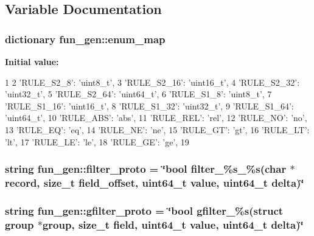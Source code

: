 \subsection{\-Variable \-Documentation}
\hypertarget{namespacefun__gen_a3f0fc2c7eb9b8116260fdfe608911309}{
\subsubsection[{enum\-\_\-map}]{\setlength{\rightskip}{0pt plus 5cm}dictionary {\bf fun\-\_\-gen\-::enum\-\_\-map}}}\label{namespacefun__gen_a3f0fc2c7eb9b8116260fdfe608911309}
{\bfseries \-Initial value\-:}
\begin{DoxyCode}
1 {
2     'RULE_S2_8': 'uint8_t',
3     'RULE_S2_16': 'uint16_t',
4     'RULE_S2_32': 'uint32_t',
5     'RULE_S2_64': 'uint64_t',
6     'RULE_S1_8': 'uint8_t',
7     'RULE_S1_16': 'uint16_t',
8     'RULE_S1_32': 'uint32_t',
9     'RULE_S1_64': 'uint64_t',
10     'RULE_ABS': 'abs',
11     'RULE_REL': 'rel',
12     'RULE_NO': 'no',
13     'RULE_EQ': 'eq',
14     'RULE_NE': 'ne',
15     'RULE_GT': 'gt',
16     'RULE_LT': 'lt',
17     'RULE_LE': 'le',
18     'RULE_GE': 'ge',
19 }
\end{DoxyCode}
\hypertarget{namespacefun__gen_aeb238801eab5d97517c3bfecab2e88b8}{
\subsubsection[{filter\-\_\-proto}]{\setlength{\rightskip}{0pt plus 5cm}string {\bf fun\-\_\-gen\-::filter\-\_\-proto} = \char`\"{}bool filter\-\_\-\%s\-\_\-\%s(char $\ast$record, size\-\_\-t field\-\_\-offset, uint64\-\_\-t value, uint64\-\_\-t delta)\char`\"{}}}\label{namespacefun__gen_aeb238801eab5d97517c3bfecab2e88b8}
\hypertarget{namespacefun__gen_a009fbfb14aad3d2d0322096cd19691f9}{
\subsubsection[{gfilter\-\_\-proto}]{\setlength{\rightskip}{0pt plus 5cm}string {\bf fun\-\_\-gen\-::gfilter\-\_\-proto} = \char`\"{}bool gfilter\-\_\-\%s(struct {\bf group} $\ast${\bf group}, size\-\_\-t field, uint64\-\_\-t value, uint64\-\_\-t delta)\char`\"{}}}\label{namespacefun__gen_a009fbfb14aad3d2d0322096cd19691f9}
